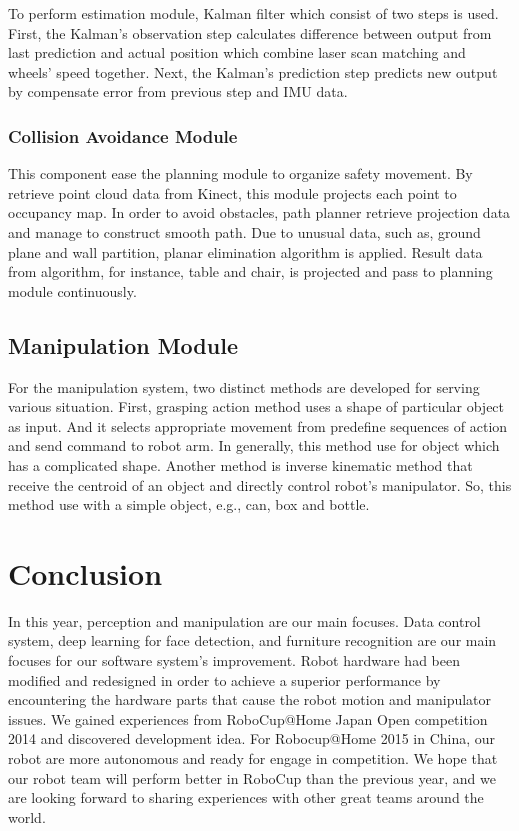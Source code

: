 \documentclass{llncs}
\begin{document}
To perform estimation module, Kalman filter which consist of two steps is used. First, the Kalman's observation step calculates difference between output from last prediction and actual position which combine laser scan matching and wheels' speed together. Next, the Kalman's prediction step predicts new output by compensate error from previous step and IMU data\cite{odom}.

\subsubsection{Collision Avoidance Module}

This component ease the planning module to organize safety movement. By retrieve point cloud data from Kinect, this module projects each point to occupancy map. In order to avoid obstacles, path planner retrieve projection data and manage to construct smooth path. Due to unusual data, such as, ground plane and wall partition, planar elimination algorithm is applied. Result data from algorithm, for instance, table and chair, is projected and pass to planning module continuously\cite{avoid}.

\subsection{Manipulation Module}

For the manipulation system, two distinct methods are developed for serving various situation. First, grasping action method uses a shape of particular object as input. And it selects appropriate movement from predefine sequences of action and send command to robot arm. In generally, this method use for object which has a complicated shape. Another method is inverse kinematic method that receive the centroid of an object and directly control robot's manipulator. So, this method use with a simple object, e.g., can, box and bottle.

\section{Conclusion}

In this year, perception and manipulation are our main focuses. Data control system, deep learning for face detection, and furniture recognition are our main focuses for our software system's improvement. Robot hardware had been modified and redesigned in order to achieve a superior performance by encountering the hardware parts that cause the robot motion and manipulator issues. We gained experiences from RoboCup@Home Japan Open competition 2014 and discovered development idea. For Robocup@Home 2015 in China, our robot are more autonomous and ready for engage in competition. We hope that our robot team will perform better in RoboCup than the previous year, and we are looking forward to sharing experiences with other great teams around the world.
\end{document}
